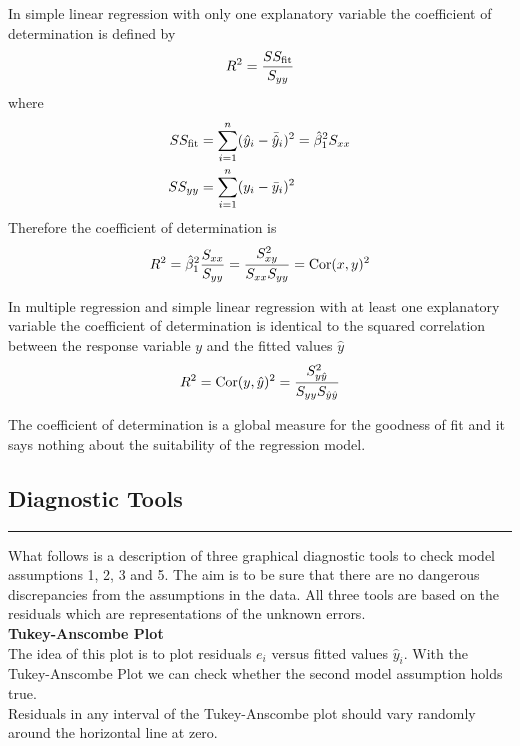 In simple linear regression with only one explanatory variable the coefficient of determination is defined by
\begin{equation}
  R^2 = \frac{SS_{\textup{fit}}}{S_{yy}}
\end{equation}
where
\begin{equation}
  \begin{split}
    SS_{\textup{fit}} &= \sum_{i=1}^n(\hat{y}_i - \bar{\hat{y}}_i)^2 = \hat{\beta}_1^2 S_{xx}\\
    SS_{yy} &= \sum_{i=1}^n(y_i - \bar{y}_i)^2
  \end{split}
\end{equation}
Therefore the coefficient of determination is
\begin{equation}
  R^2 = \hat{\beta}_1^2 \frac{S_{xx}}{S_{yy}} = \frac{S_{xy}^2}{S_{xx} S_{yy}} = \textup{Cor}(x, y)^2
\end{equation}

In multiple regression and simple linear regression with at least one explanatory variable the coefficient of determination is identical to the squared correlation between the response variable $y$ and the fitted values $\hat{y}$
\begin{equation}
  R^2 = \textup{Cor}(y, \hat{y})^2 = \frac{S_{y\hat{y}}^2}{S_{yy} S_{\hat{y}\hat{y}}}
\end{equation}

The coefficient of determination is a global measure for the goodness of fit and it says nothing about the suitability of the regression model.

\subsection{Diagnostic Tools}
\noindent\rule[\linienAbstand]{\linewidth}{\linienDicke}
What follows is a description of three graphical diagnostic tools to check model assumptions 1, 2, 3 and 5. The aim is to be sure that there are no dangerous discrepancies from the assumptions in the data. All three tools are based on the residuals which are representations of the unknown errors.\\

\textbf{Tukey-Anscombe Plot}\\
The idea of this plot is to plot residuals $e_i$ versus fitted values $\hat{y}_i$.
With the Tukey-Anscombe Plot we can check whether the second model assumption holds true.\\
Residuals in any interval of the Tukey-Anscombe plot should vary randomly around the horizontal line at zero.

